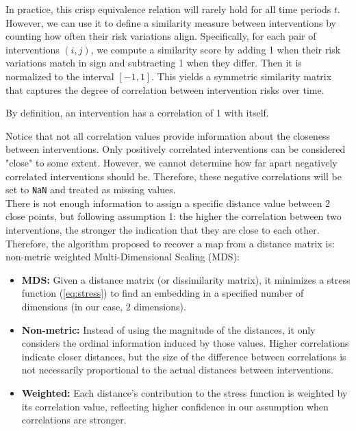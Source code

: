 In practice, this crisp equivalence relation will rarely hold for all time periods $t$. However, we can use it to define a similarity measure between interventions by counting how often their risk variations align. Specifically, for each pair of interventions $(i,j)$, we compute a similarity score by adding 1 when their risk variations match in sign and subtracting 1 when they differ. Then it is normalized to the interval $[-1,1]$. This yields a symmetric similarity matrix that captures the degree of correlation between intervention risks over time.

\begin{remark}
    By definition, an intervention has a correlation of 1 with itself.
\end{remark}

Notice that not all correlation values provide information about the closeness between interventions. Only positively correlated interventions can be considered "close" to some extent. However, we cannot determine how far apart negatively correlated interventions should be. Therefore, these negative correlations will be set to \texttt{NaN} and treated as missing values.\\

There is not enough information to assign a specific distance value between 2 close points, but following assumption 1: the higher the correlation between two interventions, the stronger the indication that they are close to each other. Therefore, the algorithm proposed to recover a map from a distance matrix is: non-metric weighted Multi-Dimensional Scaling (MDS):

\begin{itemize}
    \item \textbf{MDS:} Given a distance matrix (or dissimilarity matrix), it minimizes a stress function (\ref{eq:stress}) to find an embedding in a specified number of dimensions (in our case, 2 dimensions).
    \item \textbf{Non-metric:} Instead of using the magnitude of the distances, it only considers the ordinal information induced by those values. Higher correlations indicate closer distances, but the size of the difference between correlations is not necessarily proportional to the actual distances between interventions.
    \item \textbf{Weighted:} Each distance's contribution to the stress function is weighted by its correlation value, reflecting higher confidence in our assumption when correlations are stronger.
\end{itemize}

